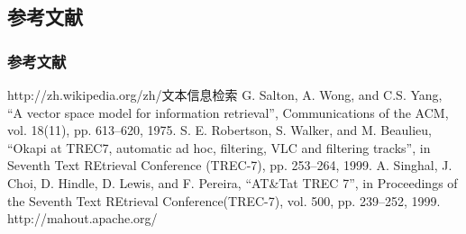 \documentclass[CJKutf8, table]{beamer}
\begin{document}
\begin{CJK}{UTF8}{gbsn}
\section{参考文献}
\begin{frame}
  \frametitle{参考文献}
  \begin{tiny}
  \begin{thebibliography}{99}
    http://zh.wikipedia.org/zh/文本信息检索
    G. Salton, A. Wong, and C.S. Yang, ``A
      vector space model for information retrieval'', Communications of the ACM,
      vol. 18(11), pp. 613–620, 1975.
    S. E. Robertson, S. Walker, and M.
      Beaulieu, ``Okapi at TREC7, automatic ad hoc, filtering, VLC and filtering
      tracks'', in Seventh Text REtrieval Conference (TREC-7), pp. 253–264, 1999.
    A. Singhal, J. Choi, D. Hindle, D. Lewis,
      and F. Pereira, ``AT\&Tat TREC 7'', in Proceedings of the Seventh Text
      REtrieval Conference(TREC-7), vol. 500, pp. 239–252, 1999.
    http://mahout.apache.org/
  \end{thebibliography}
  \end{tiny}
\end{frame}

\end{CJK}
\end{document}
